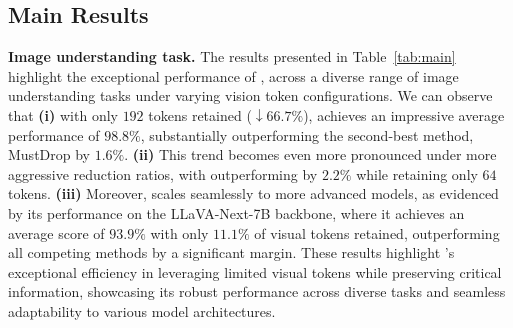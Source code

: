 \subsection{Main Results}
\textbf{Image understanding task.}
\noindent The results presented in Table~\ref{tab:main} highlight the exceptional performance of \textbf{\algname}, across a diverse range of image understanding tasks under varying vision token configurations. 
We can observe that \textbf{(i)} with only $192$ tokens retained (\(\downarrow 66.7\%\)), \algname achieves an impressive average performance of $98.8\%$, substantially outperforming the second-best method, MustDrop by $\mathbf{1.6\%}$. 
\textbf{(ii)} This trend becomes even more pronounced under more aggressive reduction ratios, with \algname outperforming by $\mathbf{2.2\%}$ while retaining only $64$ tokens.
\textbf{(iii)} Moreover, \algname scales seamlessly to more advanced models, as evidenced by its performance on the LLaVA-Next-7B backbone, where it achieves an average score of $\mathbf{93.9\%}$ with only $11.1\%$ of visual tokens retained, outperforming all competing methods by a significant margin. 
These results highlight \algname's exceptional efficiency in leveraging limited visual tokens while preserving critical information, showcasing its robust performance across diverse tasks and seamless adaptability to various model architectures.
\\
